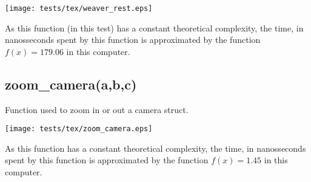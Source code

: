 \documentclass{article}
\begin{document}
\texttt{[image: tests/tex/weaver\_rest.eps]}

As this function (in this test) has a constant
theoretical complexity, the time, in nanosseconds
spent by this function is 
approximated by the function $f(x)=179.06$
in this computer.
\subsection{zoom\_camera(a,b,c)}
Function used to zoom in or out a camera struct.

\texttt{[image: tests/tex/zoom\_camera.eps]}

As this function has a constant
theoretical complexity, the time, in nanosseconds
spent by this function is 
approximated by the function $f(x)=1.45$
in this computer.
\end{document}
